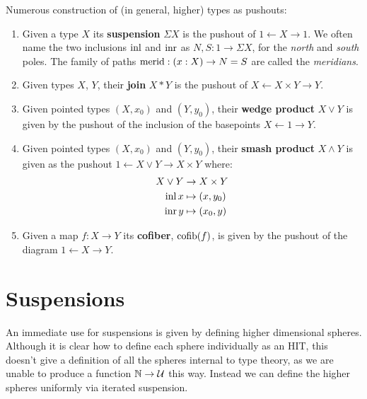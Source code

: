 \documentclass[10pt,oneside,leqno,openright]{memoir}
\begin{document}
\begin{definition} Numerous construction of (in general, higher) types as pushouts:
    \begin{enumerate}
        \item Given a type $X$ its \textbf{suspension} $\Sigma X$ is the pushout of $1 \leftarrow X \to 1$.
          We often name the two inclusions $\operatorname{inl}$ and $\operatorname{inr}$ as $N, S : 1 \to \Sigma X$,
          for the \emph{north} and \emph{south} poles.
          The family of paths $\operatorname{merid} : (x : X) \to N=S$
          are called the \emph{meridians}.
        \item Given types $X$, $Y$, their \textbf{join} $X \ast Y$ is the pushout of $X \leftarrow X \times Y \rightarrow Y$.
        \item Given pointed types $(X, x_0)$ and $(Y, y_0)$, their \textbf{wedge product} $X \vee Y$ is given by the pushout of the inclusion of the basepoints $X \leftarrow 1 \rightarrow Y$.
        \item Given pointed types $(X, x_0)$ and $(Y, y_0)$, their \textbf{smash product} $X \wedge Y$ is given as the pushout $1 \leftarrow X \vee Y \rightarrow X \times Y$ where:
        \begin{align*}
            X \vee Y &\to X \times Y \\
            \operatorname{inl} x &\mapsto (x, y_0) \\
            \operatorname{inr} y &\mapsto (x_0, y)
        \end{align*}
        \item Given a map $f : X \to Y$ its \textbf{cofiber}, $\operatorname{cofib}(f)$, is given by the pushout of the diagram $1 \leftarrow X \rightarrow Y$.
    \end{enumerate}
\end{definition}

\section{Suspensions}

An immediate use for suspensions is given by defining higher dimensional spheres.
Although it is clear how to define each sphere individually as an HIT, this doesn't give a definition of all the spheres internal to type theory, as we are unable to produce a function $\mathbb{N} \to \mathcal{U}$ this way.
Instead we can define the higher spheres uniformly via iterated suspension.
\end{document}
